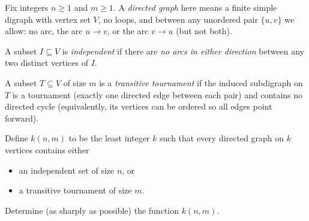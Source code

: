 Fix integers $n\ge1$ and $m\ge1$.  A \emph{directed graph} here means a finite simple digraph with vertex set $V$, no loops, and between any unordered pair $\{u,v\}$ we allow: no arc, the arc $u\to v$, or the arc $v\to u$ (but not both).

A subset $I\subseteq V$ is \emph{independent} if there are \emph{no arcs in either direction} between any two distinct vertices of $I$.

A subset $T\subseteq V$ of size $m$ is a \emph{transitive tournament} if the induced subdigraph on $T$ is a tournament (exactly one directed edge between each pair) and contains no directed cycle (equivalently, its vertices can be ordered so all edges point forward).

Define $k(n,m)$ to be the least integer $k$ such that every directed graph on $k$ vertices contains either
\begin{itemize}
\item an independent set of size $n$, or
\item a transitive tournament of size $m$.
\end{itemize}
Determine (as sharply as possible) the function $k(n,m)$.
